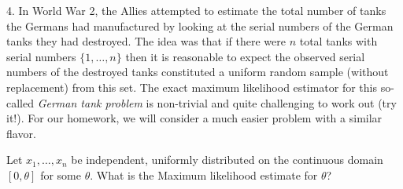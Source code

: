 4.  In World War 2, the Allies attempted to estimate the
total number of tanks the Germans had manufactured by looking at the
serial numbers of the German tanks they had destroyed. The idea was
that if there were $n$ total tanks with serial numbers $\{1,\dots,n\}$
then it is reasonable to expect the observed serial numbers of the
destroyed tanks constituted a uniform random sample (without
replacement) from this set. The exact maximum likelihood estimator for
this so-called \emph{German tank problem} is non-trivial and quite
challenging to work out (try it!). For our homework, we will consider
a much easier problem with a similar flavor.

Let $x_1,\dots,x_n$ be independent, uniformly distributed on the continuous domain $[0,\theta]$ for some $\theta$. What is the Maximum likelihood estimate for $\theta$?\\
